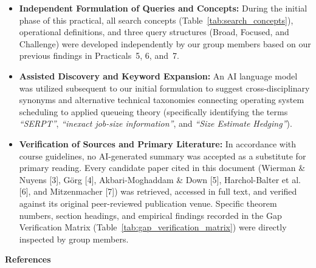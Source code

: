 \documentclass[11pt]{article}
\begin{document}
\begin{itemize}[leftmargin=1.5em]
    \item \textbf{Independent Formulation of Queries and Concepts:} During the initial phase of this practical, all search concepts (Table~\ref{tab:search_concepts}), operational definitions, and three query structures (Broad, Focused, and Challenge) were developed independently by our group members based on our previous findings in Practicals~5, 6, and~7.
    \item \textbf{Assisted Discovery and Keyword Expansion:} An AI language model was utilized subsequent to our initial formulation to suggest cross-disciplinary synonyms and alternative technical taxonomies connecting operating system scheduling to applied queueing theory (specifically identifying the terms \textit{``SERPT''}, \textit{``inexact job-size information''}, and \textit{``Size Estimate Hedging''}).
    \item \textbf{Verification of Sources and Primary Literature:} In accordance with course guidelines, no AI-generated summary was accepted as a substitute for primary reading. Every candidate paper cited in this document (Wierman \& Nuyens [3], G{\"o}rg [4], Akbari-Moghaddam \& Down [5], Harchol-Balter et al. [6], and Mitzenmacher [7]) was retrieved, accessed in full text, and verified against its original peer-reviewed publication venue. Specific theorem numbers, section headings, and empirical findings recorded in the Gap Verification Matrix (Table~\ref{tab:gap_verification_matrix}) were directly inspected by group members.
\end{itemize}


\vspace{1.5em}
{\centering\fontsize{16}{20}\selectfont\textbf{References}\par}
\vspace{1em}
\end{document}

